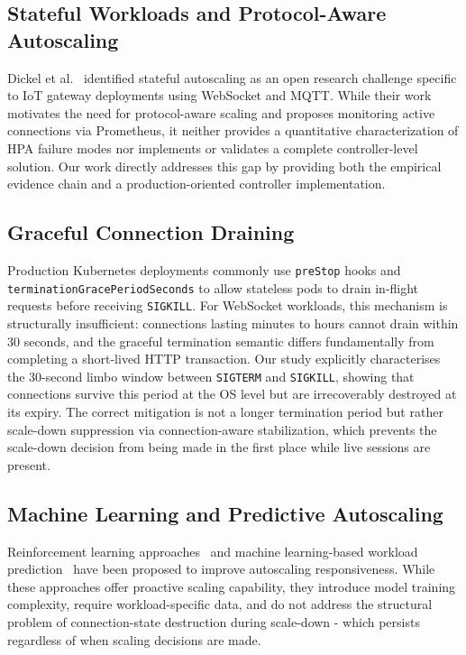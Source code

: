 \documentclass[twocolumn]{svjour3}
\begin{document}
\subsection{Stateful Workloads and Protocol-Aware Autoscaling}

Dickel et al.~\cite{dickel2019stateful} identified stateful autoscaling as an open research challenge specific to IoT gateway deployments using WebSocket and MQTT. While their work motivates the need for protocol-aware scaling and proposes monitoring active connections via Prometheus, it neither provides a quantitative characterization of HPA failure modes nor implements or validates a complete controller-level solution. Our work directly addresses this gap by providing both the empirical evidence chain and a production-oriented controller implementation.

\subsection{Graceful Connection Draining}

Production Kubernetes deployments commonly use \texttt{preStop} hooks and \texttt{terminationGracePeriodSeconds} to allow stateless pods to drain in-flight requests before receiving \texttt{SIGKILL}. For WebSocket workloads, this mechanism is structurally insufficient: connections lasting minutes to hours cannot drain within 30 seconds, and the graceful termination semantic differs fundamentally from completing a short-lived HTTP transaction. Our study explicitly characterises the 30-second limbo window between \texttt{SIGTERM} and \texttt{SIGKILL}, showing that connections survive this period at the OS level but are irrecoverably destroyed at its expiry. The correct mitigation is not a longer termination period but rather scale-down suppression via connection-aware stabilization, which prevents the scale-down decision from being made in the first place while live sessions are present.

\subsection{Machine Learning and Predictive Autoscaling}

Reinforcement learning approaches~\cite{rossi2020horizontal,imdoukh2020machine} and machine learning-based workload prediction~\cite{toka2021machine,zhong2020machine} have been proposed to improve autoscaling responsiveness. While these approaches offer proactive scaling capability, they introduce model training complexity, require workload-specific data, and do not address the structural problem of connection-state destruction during scale-down - which persists regardless of when scaling decisions are made.
\end{document}
